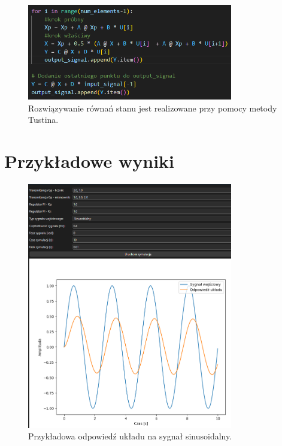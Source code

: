 \documentclass[12pt,a4paper]{article}
\begin{document}
\begin{figure}[h!]
    \centering
    \includegraphics[width=0.8\textwidth]{pentla.png}
    \caption{Rozwiązywanie równań stanu jest realizowane przy pomocy metody Tustina.}
\end{figure}

\section{Przykładowe wyniki}
\begin{figure}[h!]
    \centering
    \includegraphics[width=0.8\textwidth]{wykres1.png}
    \caption{Przykładowa odpowiedź układu na sygnał sinusoidalny.}
\end{figure}
\end{document}
